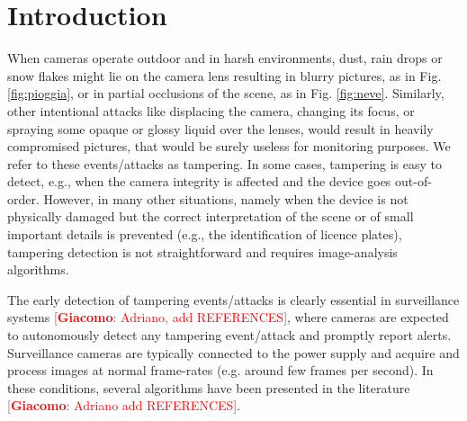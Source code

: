 \documentclass{llncs}
\newcommand{\gi}[1]{{\textcolor{red}{[\small \textbf{Giacomo}: #1]}}}
\begin{document}
\section{Introduction}\label{sec:introduction}


When cameras operate outdoor and in harsh environments, dust, rain drops or snow flakes might lie on the camera lens resulting in blurry pictures, as in Fig. \ref{fig:pioggia}, or in partial occlusions of the scene, as in Fig. \ref{fig:neve}. Similarly, other intentional attacks like displacing the camera, changing its focus, or spraying some opaque or glossy liquid over the lenses, would result in heavily compromised pictures, that would be surely useless for monitoring purposes. We refer to these events/attacks as tampering. In some cases, tampering is easy to detect, e.g., when the camera integrity is affected and the device goes out-of-order. However, in many other situations, namely when the device is not physically damaged but the correct interpretation of the scene or of small important details is prevented (e.g., the identification of licence plates), tampering detection is not straightforward and requires image-analysis algorithms.

The early detection of tampering events/attacks is clearly essential in surveillance systems \gi{Adriano, add REFERENCES}, where cameras are expected to autonomously detect any tampering event/attack and promptly report alerts. Surveillance cameras are typically connected to the power supply and acquire and process images at normal frame-rates (e.g. around few frames per second). In these conditions, several algorithms have been presented in the literature \gi{Adriano add REFERENCES}.  
\end{document}
